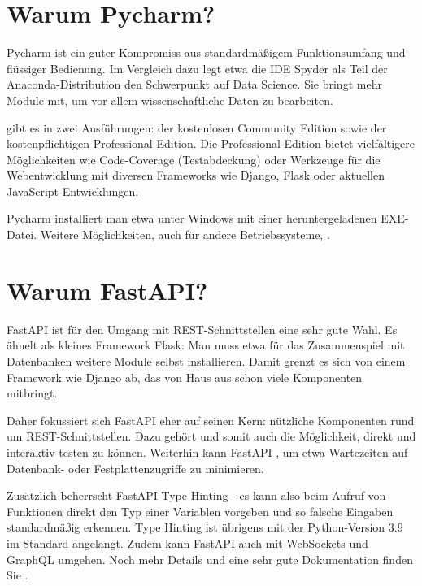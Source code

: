 \section{Warum Pycharm?}


Pycharm ist ein guter Kompromiss aus standardmäßigem Funktionsumfang und flüssiger Bedienung. Im Vergleich dazu legt etwa die IDE Spyder als Teil der Anaconda-Distribution den Schwerpunkt auf Data Science. Sie bringt mehr Module mit, um vor allem wissenschaftliche Daten zu bearbeiten.

 gibt es in zwei Ausführungen: der kostenlosen Community Edition sowie der kostenpflichtigen Professional Edition. Die Professional Edition bietet vielfältigere Möglichkeiten wie Code-Coverage (Testabdeckung) oder Werkzeuge für die Webentwicklung mit diversen Frameworks wie Django, Flask oder aktuellen JavaScript-Entwicklungen.

Pycharm installiert man etwa unter Windows mit einer heruntergeladenen EXE-Datei. Weitere Möglichkeiten, auch für andere Betriebssysteme, .

\section{Warum FastAPI?}

FastAPI ist für den Umgang mit REST-Schnittstellen eine sehr gute Wahl. Es ähnelt als kleines Framework Flask: Man muss etwa für das Zusammenspiel mit Datenbanken weitere Module selbst installieren. Damit grenzt es sich von einem Framework wie Django ab, das von Haus aus schon viele Komponenten mitbringt.

Daher fokussiert sich FastAPI eher auf seinen Kern: nützliche Komponenten rund um REST-Schnittstellen. Dazu gehört  und somit auch die Möglichkeit, direkt und interaktiv testen zu können. Weiterhin kann FastAPI , um etwa Wartezeiten auf Datenbank- oder Festplattenzugriffe zu minimieren.

Zusätzlich beherrscht FastAPI Type Hinting - es kann also beim Aufruf von Funktionen direkt den Typ einer Variablen vorgeben und so falsche Eingaben standardmäßig erkennen. Type Hinting ist übrigens mit der Python-Version 3.9 im Standard angelangt. Zudem kann FastAPI auch mit WebSockets und GraphQL umgehen. Noch mehr Details und eine sehr gute Dokumentation finden Sie .

